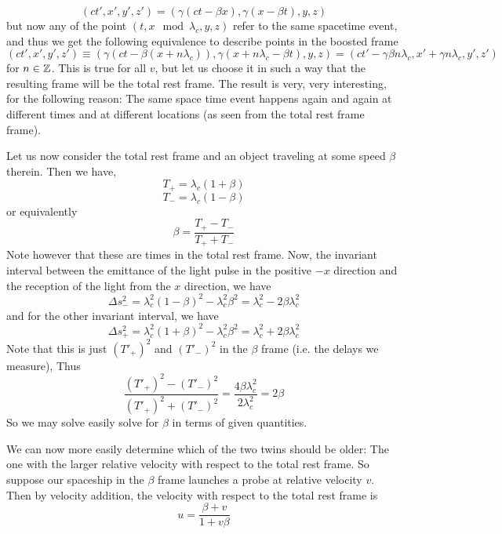 \[
(ct',x',y',z') = (\gamma(ct-\beta x),\gamma(x - \beta t),y,z) 
\]
but now any of the point $(t,x \mod \lambda_c ,y,z)$ refer to the same spacetime event, and thus we get the following equivalence to describe points in the boosted frame
\[ (ct',x',y',z') \equiv (\gamma(ct-\beta (x+n\lambda_c)),\gamma(x+n\lambda_c - \beta t),y,z) = (ct'-\gamma\beta n \lambda_c,x'+\gamma n \lambda_c,y',z') \]
for $n\in\mathbb{Z}$. This is true for all $v$, but let us choose it in such a way that the resulting frame will be the total rest frame. The result is very, very interesting, for the following reason: The same space time event happens again and again at different times and at different locations (as seen from the total rest frame frame). 

Let us now consider the total rest frame and an object traveling at some speed $\beta$ therein. Then we have,
\[ T_+ = \lambda_c(1+\beta) \]
\[ T_- = \lambda_c(1-\beta) \]
or equivalently
\[ \beta = \frac{T_+-T_-}{T_++T_-} \]
Note however that these are times in the total rest frame. 
Now, the invariant interval between the emittance of the light pulse in the positive $-x$ direction and the reception of the light from the $x$ direction, we have
\[ \Delta s_-^2 = \lambda_c^2(1-\beta)^2 - \lambda_c^2\beta^2 = \lambda_c^2 - 2\beta\lambda_c^2 \]
and for the other invariant interval, we have 
\[ \Delta s_+^2 = \lambda_c^2(1+\beta)^2 - \lambda_c^2\beta^2 = \lambda_c^2 + 2\beta\lambda_c^2 \]
Note that this is just $(T'_+)^2$ and $(T'_-)^2$ in the $\beta$ frame (i.e. the delays we measure), Thus
\[ \frac{(T'_+)^2 - (T'_-)^2}{(T'_+)^2 + (T'_-)^2} = \frac{4\beta\lambda_c^2}{2\lambda_c^2} = 2\beta \]
So we may solve easily solve for $\beta$ in terms of given quantities. \par 
We can now more easily determine which of the two twins should be older: The one with the larger relative velocity with respect to the total rest frame.
So suppose our spaceship in the $\beta$ frame launches a probe at relative velocity $v$. Then by velocity addition, the velocity with respect to the total rest frame is
\[ u=\frac{\beta+v}{1+v\beta} \]
 


